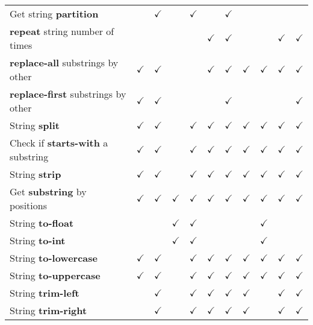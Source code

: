 \documentclass[anonymous,sigplan,review,11pt,nonacm,natbib=false]{acmart}
\begin{document}
\begin{table*}
\begin{tabular}{lllllllllll}
            Get string \textbf{partition} & & $\checkmark$ & & $\checkmark$ & & $\checkmark$ & & & & \\
            \textbf{repeat} string number of times & & & & & $\checkmark$ & $\checkmark$ & & & $\checkmark$ & $\checkmark$ \\
            \textbf{replace-all} substrings by other & $\checkmark$ & $\checkmark$ & & & $\checkmark$ & $\checkmark$ & $\checkmark$ & $\checkmark$ & $\checkmark$ & $\checkmark$ \\
            \textbf{replace-first} substrings by other & $\checkmark$ & $\checkmark$ & & & & $\checkmark$ & & & & $\checkmark$ \\
            String \textbf{split} & $\checkmark$ & $\checkmark$ & & $\checkmark$ & $\checkmark$ & $\checkmark$ & $\checkmark$ & $\checkmark$ & $\checkmark$ & $\checkmark$ \\
            Check if \textbf{starts-with} a substring & $\checkmark$ & $\checkmark$ & & $\checkmark$ & $\checkmark$ & $\checkmark$ & $\checkmark$ & $\checkmark$ & $\checkmark$ & $\checkmark$ \\
            String \textbf{strip} & $\checkmark$ & $\checkmark$ & & $\checkmark$ & $\checkmark$ & $\checkmark$ & $\checkmark$ & $\checkmark$ & $\checkmark$ & $\checkmark$ \\
            Get \textbf{substring} by positions & $\checkmark$ & $\checkmark$ & $\checkmark$ & $\checkmark$ & $\checkmark$ & $\checkmark$ & $\checkmark$ & $\checkmark$ & $\checkmark$ & $\checkmark$ \\
            String \textbf{to-float} & & & $\checkmark$ & $\checkmark$ & & & & $\checkmark$ & & \\
            String \textbf{to-int} & & & $\checkmark$ & $\checkmark$ & & & & $\checkmark$ & & \\
            String \textbf{to-lowercase} & $\checkmark$ & $\checkmark$ & & $\checkmark$ & $\checkmark$ & $\checkmark$ & $\checkmark$ & $\checkmark$ & $\checkmark$ & $\checkmark$ \\
            String \textbf{to-uppercase} & $\checkmark$ & $\checkmark$ & & $\checkmark$ & $\checkmark$ & $\checkmark$ & $\checkmark$ & $\checkmark$ & $\checkmark$ & $\checkmark$ \\
            String \textbf{trim-left} & & $\checkmark$ & & $\checkmark$ & $\checkmark$ & $\checkmark$ & $\checkmark$ & & $\checkmark$ & $\checkmark$ \\
            String \textbf{trim-right} & & $\checkmark$ & & $\checkmark$ & $\checkmark$ & $\checkmark$ & $\checkmark$ & & $\checkmark$ & $\checkmark$ \\

\end{tabular}
\end{table*}
\end{document}
